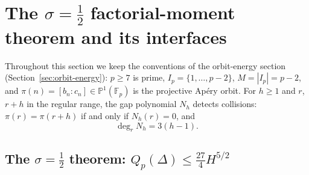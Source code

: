 
\section{The $\sigma=\tfrac12$ factorial-moment theorem and its interfaces}
\label{sec:sigma-half}

Throughout this section we keep the conventions of the orbit-energy
section (Section~\ref{sec:orbit-energy}): $p\ge7$ is prime,
$I_p=\{1,\ldots,p-2\}$, $M=|I_p|=p-2$, and
$\pi(n)=[b_n:c_n]\in\mathbb P^1(\mathbb F_p)$ is the projective Ap\'ery
orbit.  For $h\ge1$ and $r$, $r+h$ in the regular range, the gap
polynomial $N_h$ detects collisions:
$\pi(r)=\pi(r+h)$ if and only if $N_h(r)=0$, and
\begin{equation}\label{eq:sh-degree}
 \deg_rN_h=3(h-1).
\end{equation}

\subsection{The $\sigma=\tfrac12$ theorem:
$Q_p(\Delta)\le\tfrac{27}{4}H^{5/2}$}
\label{sec:sh-sigma-half}

